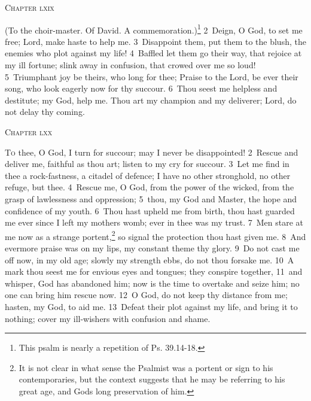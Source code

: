 \documentclass[10pt]{book} %
\begin{document}
\begin{large}\begin{center}\textsc{Chapter lxix}\end{center}\end{large}
(To the choir-master. Of David. A commemoration.)\footnote[1]{This psalm is nearly a repetition of Ps. 39.14-18.}
\textcolor{benred8}{2}~Deign, O God, to set me free; Lord, make haste to help me. \textcolor{benred8}{3}~Disappoint them, put them to the blush, the enemies who plot against my life! \textcolor{benred8}{4}~Baffled let them go their way, that rejoice at my ill fortune; slink away in confusion, that crowed over me so loud! \textcolor{benred8}{5}~Triumphant joy be theirs, who long for thee; Praise to the Lord, be ever their song, who look eagerly now for thy succour. \textcolor{benred8}{6}~Thou seest me helpless and destitute; my God, help me. Thou art my champion and my deliverer; Lord, do not delay thy coming.
\begin{large}\begin{center}\textsc{Chapter lxx}\end{center}\end{large}
\lettrine[lines=2]{T}{o} thee, O God, I turn for succour; may I never be disappointed! \textcolor{benred8}{2}~Rescue and deliver me, faithful as thou art; listen to my cry for succour. \textcolor{benred8}{3}~Let me find in thee a rock-fastness, a citadel of defence; I have no other stronghold, no other refuge, but thee. \textcolor{benred8}{4}~Rescue me, O God, from the power of the wicked, from the grasp of lawlessness and oppression; \textcolor{benred8}{5}~thou, my God and Master, the hope and confidence of my youth. \textcolor{benred8}{6}~Thou hast upheld me from birth, thou hast guarded me ever since I left my mother\textquotesingle s womb; ever in thee was my trust. \textcolor{benred8}{7}~Men stare at me now as a strange portent,\footnote[1]{It is not clear in what sense the Psalmist was a portent or sign to his contemporaries, but the context suggests that he may be referring to his great age, and God\textquotesingle s long preservation of him.} so signal the protection thou hast given me. \textcolor{benred8}{8}~And evermore praise was on my lips, my constant theme thy glory.
\textcolor{benred8}{9}~Do not cast me off now, in my old age; slowly my strength ebbs, do not thou forsake me. \textcolor{benred8}{10}~A mark thou seest me for envious eyes and tongues; they conspire together, \textcolor{benred8}{11}~and whisper, God has abandoned him; now is the time to overtake and seize him; no one can bring him rescue now. \textcolor{benred8}{12}~O God, do not keep thy distance from me; hasten, my God, to aid me. \textcolor{benred8}{13}~Defeat their plot against my life, and bring it to nothing; cover my ill-wishers with confusion and shame.
\end{document}
